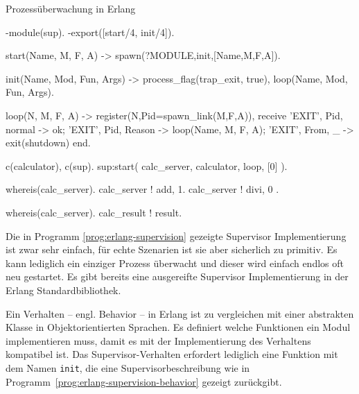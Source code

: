 \begin{program}[!hbt]
\caption{Prozessüberwachung in Erlang}
\label{prog:erlang-supervision}
\noindent\begin{minipage}[t]{.52\textwidth}
\lstset{showlines=true}
\begin{ErlangCode}
-module(sup).
-export([start/4, init/4]).

start(Name, M, F, A) ->
  spawn(?MODULE,init,[Name,M,F,A]).

init(Name, Mod, Fun, Args) ->
  process_flag(trap_exit, true),
  loop(Name, Mod, Fun, Args).

loop(N, M, F, A) ->
  register(N,Pid=spawn_link(M,F,A)),
  receive
    { 'EXIT', Pid, normal } -> ok;
    { 'EXIT', Pid, Reason } -> 
      loop(Name, M, F, A);
    { 'EXIT', From, _ } -> 
			exit(shutdown)
  end.
\end{ErlangCode}

\end{minipage}\hfill
\begin{minipage}[t]{.44\textwidth}
\lstset{showlines=true}
\begin{ErlangCode}
c(calculator), c(sup).
sup:start(
  calc_server, 
  calculator, loop, [0]
).

whereis(calc_server).
calc_server ! {add, 1}.
calc_server ! { divi, 0 }.

whereis(calc_server). 
calc_result ! result.
\end{ErlangCode}

\end{minipage}
\end{program}

Die in Programm \ref{prog:erlang-supervision} gezeigte Supervisor Implementierung ist zwar sehr einfach, für echte Szenarien ist sie aber sicherlich zu primitiv. Es kann lediglich ein einziger Prozess überwacht und dieser wird einfach endlos oft neu gestartet. Es gibt bereits eine ausgereifte Supervisor Implementierung in der Erlang Standardbibliothek.

Ein Verhalten -- engl. Behavior -- in Erlang ist zu vergleichen mit einer abstrakten Klasse in Objektorientierten Sprachen. Es definiert welche Funktionen ein Modul implementieren muss, damit es mit der Implementierung des Verhaltens kompatibel ist. Das Supervisor-Verhalten erfordert lediglich eine Funktion mit dem Namen \lstinline{init}, die eine Supervisorbeschreibung wie in Programm~\ref{prog:erlang-supervision-behavior} gezeigt zurückgibt.

